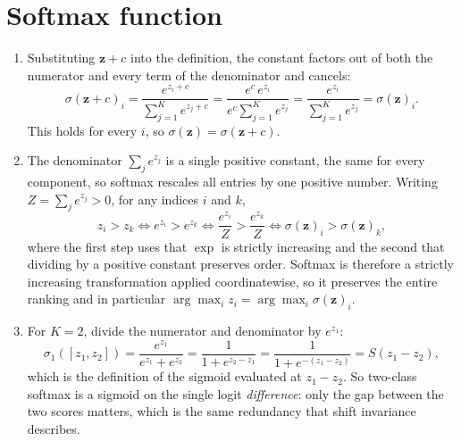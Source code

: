 \documentclass[11pt]{article}
\begin{document}
\section{Softmax function}

\begin{enumerate}
  \item Substituting $\mathbf{z} + c$ into the definition, the constant factors out of both the numerator
        and every term of the denominator and cancels:
        \[
          \sigma(\mathbf{z} + c)_i
          = \frac{e^{z_i + c}}{\sum_{j=1}^{K} e^{z_j + c}}
          = \frac{e^{c}\,e^{z_i}}{e^{c}\sum_{j=1}^{K} e^{z_j}}
          = \frac{e^{z_i}}{\sum_{j=1}^{K} e^{z_j}}
          = \sigma(\mathbf{z})_i .
        \]
        This holds for every $i$, so $\sigma(\mathbf{z}) = \sigma(\mathbf{z}+c)$.



  \item The denominator $\sum_j e^{z_j}$ is a single positive constant, the same for every component, so
        softmax rescales all entries by one positive number. Writing $Z = \sum_j e^{z_j} > 0$, for any
        indices $i$ and $k$,
        \[
          z_i > z_k
          \iff e^{z_i} > e^{z_k}
          \iff \frac{e^{z_i}}{Z} > \frac{e^{z_k}}{Z}
          \iff \sigma(\mathbf{z})_i > \sigma(\mathbf{z})_k ,
        \]
        where the first step uses that $\exp$ is strictly increasing and the second that dividing by a
        positive constant preserves order. Softmax is therefore a strictly increasing transformation
        applied coordinatewise, so it preserves the entire ranking and in particular
        $\arg\max_i z_i = \arg\max_i \sigma(\mathbf{z})_i$.

  \item For $K = 2$, divide the numerator and denominator by $e^{z_1}$:
        \[
          \sigma_1([z_1,z_2])
          = \frac{e^{z_1}}{e^{z_1} + e^{z_2}}
          = \frac{1}{1 + e^{z_2 - z_1}}
          = \frac{1}{1 + e^{-(z_1 - z_2)}}
          = S(z_1 - z_2),
        \]
        which is the definition of the sigmoid evaluated at $z_1 - z_2$. So two-class softmax is a
        sigmoid on the single logit \emph{difference}: only the gap between the two scores matters, which is
        the same redundancy that shift invariance describes.


\end{enumerate}
\end{document}
